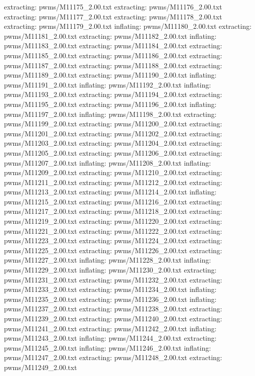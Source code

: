 \documentclass[letterpaper,10pt,english]{sphinxmanual}
\begin{document}
{\begin{sphinxVerbatim}[commandchars=\\\{\}]
 extracting: pwms/M11175\_2.00.txt
 extracting: pwms/M11176\_2.00.txt
 extracting: pwms/M11177\_2.00.txt
 extracting: pwms/M11178\_2.00.txt
 extracting: pwms/M11179\_2.00.txt
  inflating: pwms/M11180\_2.00.txt
 extracting: pwms/M11181\_2.00.txt
 extracting: pwms/M11182\_2.00.txt
  inflating: pwms/M11183\_2.00.txt
 extracting: pwms/M11184\_2.00.txt
 extracting: pwms/M11185\_2.00.txt
 extracting: pwms/M11186\_2.00.txt
 extracting: pwms/M11187\_2.00.txt
 extracting: pwms/M11188\_2.00.txt
 extracting: pwms/M11189\_2.00.txt
 extracting: pwms/M11190\_2.00.txt
  inflating: pwms/M11191\_2.00.txt
  inflating: pwms/M11192\_2.00.txt
  inflating: pwms/M11193\_2.00.txt
 extracting: pwms/M11194\_2.00.txt
 extracting: pwms/M11195\_2.00.txt
 extracting: pwms/M11196\_2.00.txt
  inflating: pwms/M11197\_2.00.txt
  inflating: pwms/M11198\_2.00.txt
 extracting: pwms/M11199\_2.00.txt
 extracting: pwms/M11200\_2.00.txt
 extracting: pwms/M11201\_2.00.txt
 extracting: pwms/M11202\_2.00.txt
 extracting: pwms/M11203\_2.00.txt
 extracting: pwms/M11204\_2.00.txt
 extracting: pwms/M11205\_2.00.txt
 extracting: pwms/M11206\_2.00.txt
 extracting: pwms/M11207\_2.00.txt
  inflating: pwms/M11208\_2.00.txt
  inflating: pwms/M11209\_2.00.txt
 extracting: pwms/M11210\_2.00.txt
 extracting: pwms/M11211\_2.00.txt
 extracting: pwms/M11212\_2.00.txt
 extracting: pwms/M11213\_2.00.txt
 extracting: pwms/M11214\_2.00.txt
  inflating: pwms/M11215\_2.00.txt
 extracting: pwms/M11216\_2.00.txt
 extracting: pwms/M11217\_2.00.txt
 extracting: pwms/M11218\_2.00.txt
 extracting: pwms/M11219\_2.00.txt
 extracting: pwms/M11220\_2.00.txt
 extracting: pwms/M11221\_2.00.txt
 extracting: pwms/M11222\_2.00.txt
 extracting: pwms/M11223\_2.00.txt
 extracting: pwms/M11224\_2.00.txt
 extracting: pwms/M11225\_2.00.txt
 extracting: pwms/M11226\_2.00.txt
 extracting: pwms/M11227\_2.00.txt
  inflating: pwms/M11228\_2.00.txt
  inflating: pwms/M11229\_2.00.txt
  inflating: pwms/M11230\_2.00.txt
 extracting: pwms/M11231\_2.00.txt
 extracting: pwms/M11232\_2.00.txt
 extracting: pwms/M11233\_2.00.txt
 extracting: pwms/M11234\_2.00.txt
  inflating: pwms/M11235\_2.00.txt
 extracting: pwms/M11236\_2.00.txt
  inflating: pwms/M11237\_2.00.txt
 extracting: pwms/M11238\_2.00.txt
 extracting: pwms/M11239\_2.00.txt
 extracting: pwms/M11240\_2.00.txt
 extracting: pwms/M11241\_2.00.txt
 extracting: pwms/M11242\_2.00.txt
  inflating: pwms/M11243\_2.00.txt
  inflating: pwms/M11244\_2.00.txt
 extracting: pwms/M11245\_2.00.txt
  inflating: pwms/M11246\_2.00.txt
  inflating: pwms/M11247\_2.00.txt
 extracting: pwms/M11248\_2.00.txt
 extracting: pwms/M11249\_2.00.txt

\end{sphinxVerbatim}}
\end{document}
